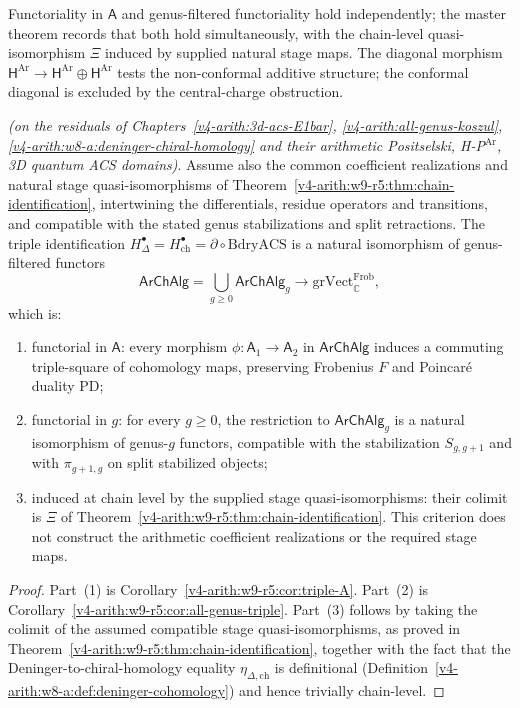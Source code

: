 Functoriality in \(\mathsf{A}\) and genus-filtered functoriality hold
independently; the master theorem records that both hold simultaneously,
with the chain-level quasi-isomorphism \(\Xi\) induced by supplied
natural stage maps. The diagonal morphism
\(\mathsf{H}^{\mathrm{Ar}}\to\mathsf{H}^{\mathrm{Ar}}\oplus\mathsf{H}^{\mathrm{Ar}}\)
tests the non-conformal additive structure; the conformal diagonal is
excluded by the central-charge obstruction.

\begin{theorem}
\label{v4-arith:w9-r5:thm:master-functoriality}
\ClaimStatusProvedHereConditional \emph{(on the residuals of
Chapters~\ref{v4-arith:3d-acs-E1bar},
\ref{v4-arith:all-genus-koszul},
\ref{v4-arith:w8-a:deninger-chiral-homology} and their arithmetic
Positselski, H-P\(^{\mathrm{Ar}}\), 3D quantum ACS domains)}.
Assume also the common coefficient realizations and natural stage
quasi-isomorphisms of
Theorem~\ref{v4-arith:w9-r5:thm:chain-identification}, intertwining the
differentials, residue operators and transitions, and compatible with
the stated genus stabilizations and split retractions. The
triple identification
\(H^{\bullet}_{\Delta}=H^{\bullet}_{\mathrm{ch}}=\partial\circ\mathrm{BdryACS}\)
is a natural isomorphism of genus-filtered functors
\[
\mathsf{ArChAlg}=\bigcup_{g\geq 0}\mathsf{ArChAlg}_{g}
\longrightarrow\mathrm{grVect}_{\mathbb{C}}^{\mathrm{Frob}},
\]
which is:
\begin{enumerate}
\item functorial in \(\mathsf{A}\): every morphism
\(\phi\colon\mathsf{A}_{1}\to\mathsf{A}_{2}\) in \(\mathsf{ArChAlg}\)
induces a commuting triple-square of cohomology maps, preserving
Frobenius \(F\) and Poincar\'e duality \(\mathrm{PD}\);
\item functorial in \(g\): for every \(g\geq 0\), the restriction to
\(\mathsf{ArChAlg}_{g}\) is a natural isomorphism of genus-\(g\)
functors, compatible with the stabilization \(S_{g,g+1}\) and with
\(\pi_{g+1,g}\) on split stabilized objects;
\item induced at chain level by the supplied stage quasi-isomorphisms:
their colimit is \(\Xi\) of
Theorem~\ref{v4-arith:w9-r5:thm:chain-identification}.
This criterion does not construct the arithmetic coefficient
realizations or the required stage maps.
\end{enumerate}
\end{theorem}

\begin{proof}
Part~(1) is Corollary~\ref{v4-arith:w9-r5:cor:triple-A}.
Part~(2) is Corollary~\ref{v4-arith:w9-r5:cor:all-genus-triple}.
Part~(3) follows by taking the colimit of the assumed compatible
stage quasi-isomorphisms, as proved in
Theorem~\ref{v4-arith:w9-r5:thm:chain-identification}, together with the
fact that the Deninger-to-chiral-homology equality
\(\eta_{\Delta,\mathrm{ch}}\) is definitional
(Definition~\ref{v4-arith:w8-a:def:deninger-cohomology}) and hence trivially
chain-level.
\end{proof}

